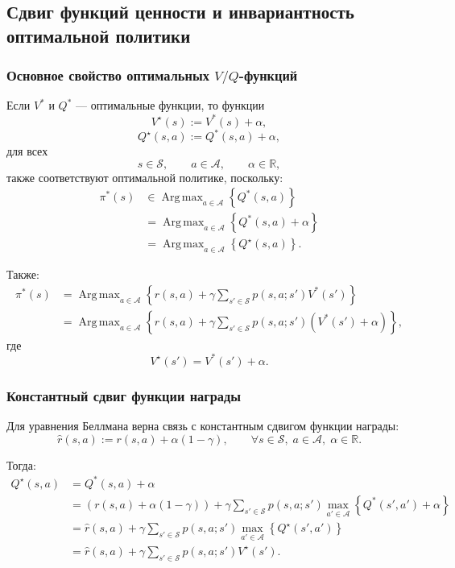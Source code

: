 \documentclass[12pt,a4paper]{article}
\begin{document}
\subsection{Сдвиг функций ценности и инвариантность оптимальной политики}

\subsubsection{Основное свойство оптимальных $V/Q$-функций}

Если $V^\ast$ и $Q^\ast$ --- оптимальные функции, то функции
\[
V^\star(s) := V^\ast(s) + \alpha,
\]
\[
Q^\star(s,a) := Q^\ast(s,a) + \alpha,
\]
для всех
\[
s \in \mathcal S,\qquad a \in \mathcal A,\qquad \alpha \in \mathbb R,
\]
также соответствуют оптимальной политике, поскольку:
\[
\begin{aligned}
\pi^\ast(s)
&\in
\operatorname{Arg\,max}_{a \in \mathcal A}
\left\{
Q^\ast(s,a)
\right\}
\\
&=
\operatorname{Arg\,max}_{a \in \mathcal A}
\left\{
Q^\ast(s,a)+\alpha
\right\}
\\
&=
\operatorname{Arg\,max}_{a \in \mathcal A}
\left\{
Q^\star(s,a)
\right\}.
\end{aligned}
\]

Также:
\[
\begin{aligned}
\pi^\ast(s)
&=
\operatorname{Arg\,max}_{a \in \mathcal A}
\left\{
r(s,a)
+
\gamma
\sum_{s' \in \mathcal S}
p(s,a;s')V^\ast(s')
\right\}
\\
&=
\operatorname{Arg\,max}_{a \in \mathcal A}
\left\{
r(s,a)
+
\gamma
\sum_{s' \in \mathcal S}
p(s,a;s')
\left(
V^\ast(s')+\alpha
\right)
\right\},
\end{aligned}
\]
где
\[
V^\star(s') = V^\ast(s')+\alpha.
\]

\subsubsection{Константный сдвиг функции награды}

Для уравнения Беллмана верна связь с константным сдвигом функции награды:
\[
\hat r(s,a)
:=
r(s,a)+\alpha(1-\gamma),
\qquad
\forall s \in \mathcal S,\; a \in \mathcal A,\; \alpha \in \mathbb R.
\]

Тогда:
\[
\begin{aligned}
Q^\star(s,a)
&=
Q^\ast(s,a)+\alpha
\\
&=
\left(
r(s,a)+\alpha(1-\gamma)
\right)
+
\gamma
\sum_{s' \in \mathcal S}
p(s,a;s')
\max_{a' \in \mathcal A}
\left\{
Q^\ast(s',a')+\alpha
\right\}
\\
&=
\hat r(s,a)
+
\gamma
\sum_{s' \in \mathcal S}
p(s,a;s')
\max_{a' \in \mathcal A}
\left\{
Q^\star(s',a')
\right\}
\\
&=
\hat r(s,a)
+
\gamma
\sum_{s' \in \mathcal S}
p(s,a;s')V^\star(s').
\end{aligned}
\]
\end{document}
